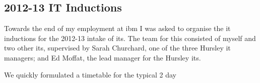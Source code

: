 \documentclass[a4paper,11pt]{report}
\begin{document}
\subsection{2012-13 IT Inductions}

Towards the end of my employment at \gls{ibm} I was asked to organise the \gls{it} inductions for
the 2012-13 intake of \gls{it}s. The team for this consisted of myself and two other \gls{it}s, 
supervised by Sarah Churchard, one of the three Hursley \gls{it} managers; and Ed Moffat, the lead
manager for the Hursley \gls{it}s.

We quickly formulated a timetable for the typical 2 day 
\end{document}

